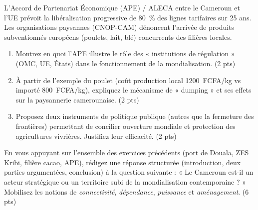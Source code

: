 \documentclass[11pt]{article}
\begin{document}
\begin{exercice}
L'Accord de Partenariat Économique (APE) / ALECA entre le Cameroun et l'UE prévoit la libéralisation progressive de \SI{80}{\percent} des lignes tarifaires sur 25 ans. Les organisations paysannes (CNOP-CAM) dénoncent l'arrivée de produits subventionnés européens (poulets, lait, blé) concurrents des filières locales.

\begin{enumerate}
    \item Montrez en quoi l'APE illustre le rôle des « institutions de régulation » (OMC, UE, États) dans le fonctionnement de la mondialisation. (2 pts)
    \item À partir de l'exemple du poulet (coût production local \SI{1200}{FCFA/kg} vs importé \SI{800}{FCFA/kg}), expliquez le mécanisme de « dumping » et ses effets sur la paysannerie camerounaise. (2 pts)
    \item Proposez deux instruments de politique publique (autres que la fermeture des frontières) permettant de concilier ouverture mondiale et protection des agricultures vivrières. Justifiez leur efficacité. (2 pts)
\end{enumerate}
\end{exercice}

\begin{exercice}
En vous appuyant sur l'ensemble des exercices précédents (port de Douala, ZES Kribi, filière cacao, APE), rédigez une réponse structurée (introduction, deux parties argumentées, conclusion) à la question suivante : 
« Le Cameroun est-il un acteur stratégique ou un territoire subi de la mondialisation contemporaine ? » 
Mobilisez les notions de \textit{connectivité}, \textit{dépendance}, \textit{puissance} et \textit{aménagement}. (6 pts)
\end{exercice}
\end{document}
